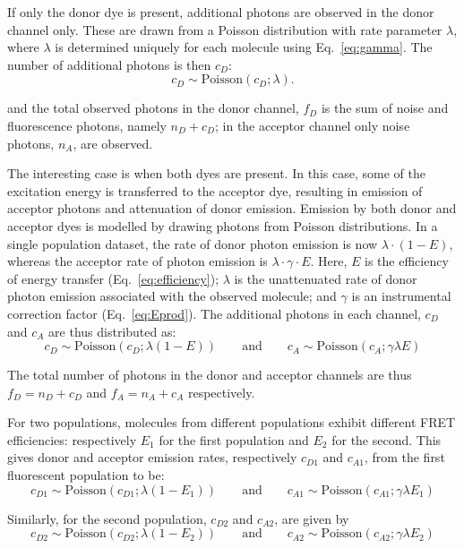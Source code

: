 If only the donor dye is present, additional photons are observed in the donor channel only. These are drawn from a Poisson distribution with rate parameter $\lambda$, where $\lambda$ is determined uniquely for each molecule using Eq.~\ref{eq:gamma}. The number of additional photons is then $c_D$:
\begin{equation}
c_D \sim \text{Poisson}(c_{D}; \lambda). 
\end{equation}

and the total observed photons in the donor channel, $f_D$ is the sum of noise and fluorescence photons, namely $n_D + c_D$; in the acceptor channel only noise photons, $n_A$, are observed.

The interesting case is when both dyes are present.  In this case, some of the excitation energy is transferred to the acceptor dye, resulting in emission of acceptor photons and attenuation of donor emission.  Emission by both donor and acceptor dyes is modelled by drawing photons from Poisson distributions. In a single population dataset, the rate of donor photon emission is now $\lambda\cdot(1-E)$, whereas the acceptor rate of photon emission is $\lambda \cdot \gamma \cdot E$. Here, $E$ is the efficiency of energy transfer (Eq.~\ref{eq:efficiency}); $\lambda$ is the unattenuated rate of donor photon emission associated with the observed molecule; and $\gamma$ is an instrumental correction factor (Eq.~\ref{eq:Eprod}). The additional photons in each channel, $c_D$ and $c_A$ are thus distributed as:
\begin{equation}
c_D \sim \text{Poisson}(c_D; \lambda (1-E)) \qquad \text{and} \qquad c_A \sim \text{Poisson}(c_A; \gamma \lambda E)
\end{equation}

The total number of photons in the donor and acceptor channels are thus $f_D = n_D + c_D$ and $f_A = n_A + c_A$ respectively.   

For two populations, molecules from different populations exhibit different FRET efficiencies: respectively $E_1$ for the first population and $E_2$ for the second. This gives donor and acceptor emission rates, respectively $c_{D1}$ and $c_{A1}$, from the first fluorescent population to be:
\begin{equation}
 c_{D1} \sim \text{Poisson}(c_{D1}; \lambda(1-E_1)) \qquad \text{and} \qquad c_{A1} \sim \text{Poisson}(c_{A1}; \gamma \lambda E_1) 
\end{equation}

Similarly, for the second population, $c_{D2}$ and $c_{A2}$, are given by
\begin{equation}
 c_{D2} \sim \text{Poisson}(c_{D2}; \lambda(1-E_2)) \qquad \text{and} \qquad c_{A2} \sim \text{Poisson}(c_{A2}; \gamma \lambda E_2) 
\end{equation}

